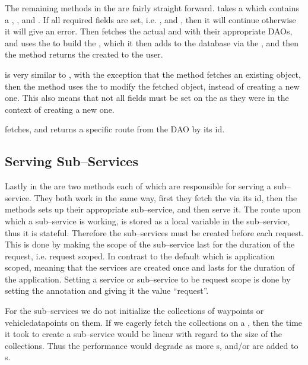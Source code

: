 \bigskip
The remaining methods in the  are fairly straight forward.
 takes a  which contains a , , and .
If all required fields are set, i.e. , and , then it will continue otherwise it will give an error.
Then  fetches the actual  and  with their appropriate \acp{DAO}, and uses the  to build the ,
which it then adds to the database via the , and then the method returns the  created to the user.

 is very similar to , with the exception that the method fetches an existing object,
then the method uses the  to modify the fetched object, instead of creating a new one.
This also means that not all fields must be set on the  as they were in the context of creating a new one.

 fetches, and returns a specific route from the \ac{DAO} by its id.

\subsection{Serving Sub--Services}
Lastly in the  are two methods each of which are responsible for serving a sub--service.
They both work in the same way, first they fetch the  via its id, then the methods sets up their appropriate sub--service, and then serve it.
The route upon which a sub--service is working, is stored as a local variable in the sub--service, thus it is stateful.
Therefore the sub--services must be created before each request.
This is done by making the scope of the sub--service last for the duration of the request, i.e. request scoped.
In contrast to the default which is application scoped, meaning that the services are created once and lasts for the duration of the application.
Setting a service or sub--service to be request scope is done by setting the  annotation and giving it the value ``request''.

For the sub--services we do not initialize the collections of waypoints or vehicledatapoints on them.
If we eagerly fetch the collections on a , then the time it took to create a sub--service would be linear with regard to the size of the collections.
Thus the performance would degrade as more s, and/or  are added to s.

